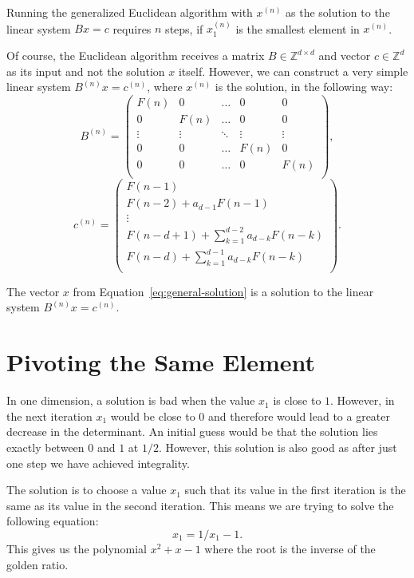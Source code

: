 \documentclass[english,version-2020-11]{uzl-thesis}
\newcommand\Z{{\mathbb Z}}
\begin{document}
\begin{corollary}
  Running the generalized Euclidean algorithm with $x^{(n)}$ as the solution to
  the linear system $B x = c$ requires $n$ steps, if $x^{(n)}_1$ is the
  smallest element in $x^{(n)}$.
\end{corollary}

Of course, the Euclidean algorithm receives a matrix $B \in \Z^{d \times d}$
and vector $c \in \Z^d$ as its input and not the solution $x$ itself.
However, we can construct a very simple linear system $B^{(n)} x = c^{(n)}$,
where $x^{(n)}$ is the solution, in the following way:
\[
  B^{(n)} =
  \begin{pmatrix}
    F(n) & 0 & \dots & 0 & 0 \\
    0 & F(n) & \dots & 0 & 0 \\
    \vdots & \vdots & \ddots & \vdots & \vdots \\
    0 & 0 & \dots & F(n) & 0 \\
    0 & 0 & \dots & 0 & F(n) \\
  \end{pmatrix},
\]
\[
  c^{(n)} =
  \begin{pmatrix}
    F(n - 1) \\
    F(n - 2) + a_{d-1} F(n - 1) \\
    \vdots \\
    F(n - d + 1) + \sum_{k=1}^{d-2} a_{d-k} F(n - k) \\
    F(n - d) + \sum_{k=1}^{d-1} a_{d-k} F(n - k) \\
  \end{pmatrix}.
\]

\begin{lemma}
  The vector $x$ from Equation~\ref{eq:general-solution} is a solution to the
  linear system $B^{(n)} x = c^{(n)}$.
\end{lemma}

\section{Pivoting the Same Element}

In one dimension, a solution is bad when the value $x_1$ is close to $1$.
However, in the next iteration $x_1$ would be close to $0$ and therefore
would lead to a greater decrease in the determinant.
An initial guess would be that the solution lies exactly between $0$ and $1$ at $1/2$.
However, this solution is also good as after just one step we have achieved integrality.

The solution is to choose a value $x_1$ such that its value in the first
iteration is the same as its value in the second iteration.
This means we are trying to solve the following equation:
\[
  x_1 = 1/x_1 - 1.
\]
This gives us the polynomial $x^2 + x - 1$ where the root is the inverse of the
golden ratio.
\end{document}
